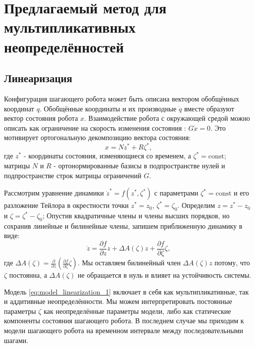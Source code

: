 \chapter{Предлагаемый метод для мультипликативных неопределённостей}\label{ch:ch3}
\section{Линеаризация}\label{sec:ch3/sect1}
Конфигурация шагающего робота может быть описана вектором обобщённых координат $q$. Обобщённые координаты и их производные $\dot q$ вместе образуют вектор состояния робота $x$. Взаимодействие робота с окружающей средой можно описать как ограничение на скорость изменения состояния \cite{mason2014full}: ${G} \dot x = 0$. Это мотивирует ортогональную декомпозицию вектора состояния:
%
\begin{equation}
	x = {N} z^* + {R} \zeta^* ,
\end{equation}
%
где $z^*$ - координаты состояния, изменяющиеся со временем, а $\zeta^* = \text{const}$; матрицы ${N}$ и ${R}$ - ортонормированные базисы в подпространстве нулей и подпространстве строк матрицы ограничений ${G}$.

Рассмотрим уравнение динамики $\dot z^* = f(z^*, \zeta^*)$ с параметрами $\zeta^* = \text{const}$ и его разложение Тейлора в окрестности точки $z^* = z_0$, $\zeta^* = \zeta_0$. Определим $z = z^* - z_0$ и $\zeta = \zeta^* - \zeta_0$;
Опустив квадратичные члены и члены высших порядков, но сохранив линейные и билинейные члены, запишем приближенную динамику в виде:
%
\begin{equation}
	\label{eq:model_linearization_1}
	\dot z = \frac{\partial f}{\partial z} z + \Delta {A}(\zeta) z + \frac{\partial f}{\partial \zeta} \zeta ,
\end{equation}
%
где $\Delta {A}(\zeta) = \frac{\partial}{\partial z} (\frac{\partial f}{\partial \zeta} \zeta)$. Мы оставляем билинейный член $\Delta {A}(\zeta) z$ потому, что $\zeta$ постоянна, а $\Delta {A}(\zeta)$ не обращается в нуль и влияет на устойчивость системы.

Модель \eqref{eq:model_linearization_1} включает в себя как мультипликативные, так и аддитивные неопределённости. Мы можем интерпретировать постоянные параметры $\zeta$ как неопределённые параметры модели, либо как статические компоненты состояния шагающего робота. В последнем случае мы приходим к модели шагающего робота на временном интервале между последовательными шагами.

